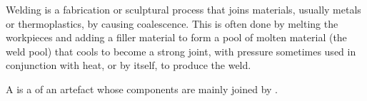 \begin{module}[id=welding]
\begin{definition}  
  Welding is a fabrication or sculptural process that joins materials, usually metals or
  thermoplastics, by causing coalescence. This is often done by melting the workpieces and
  adding a filler material to form a pool of molten material (the weld pool) that cools to
  become a strong joint, with pressure sometimes used in conjunction with heat, or by
  itself, to produce the weld.
\end{definition}

\begin{definition}
  A  is a  of an artefact whose components
  are mainly joined by .
\end{definition}
\end{module}

